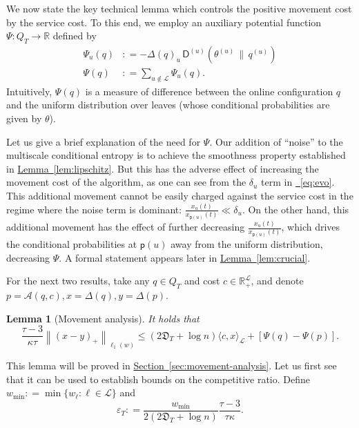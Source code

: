 \documentclass[11pt]{article}
\numberwithin{equation}{section}
\newtheorem{lemma}[theorem]{Lemma}
\theoremstyle{definition}
\theoremstyle{plain}
\newcommand{\R}{\mathbb R}
\newcommand{\expref}[2]{\hyperref[#2]{#1~\ref{#2}}}
\newcommand{\expeqref}[2]{\hyperref[#2]{#1~\eqref{#2}}}
\newcommand{\calA}{\mathcal A}
\newcommand{\calL}{\mathcal L}
\newcommand{\dmid}{\,\|\,}
\newcommand{\eps}{\varepsilon}
\newcommand{\depth}{\mathfrak{D}}
\newcommand{\seteq}{\mathrel{\mathop:}=}
\newcommand{\sfp}{\mathsf{p}}
\newcommand{\sfD}{\mathsf D}
\begin{document}
We now state the key technical lemma
which controls the positive movement cost by
the service cost.  To this end, we employ an auxiliary potential function $\Psi : Q_T \to \R$ defined by
\begin{align*}
\Psi_u(q) &\seteq - \Delta(q)_u\,\sfD^{(u)}\!\left(\theta^{(u)} \dmid q^{(u)}\right) \\
\Psi(q) &\seteq \sum_{u \notin \calL} \Psi_u(q).
\end{align*}
Intuitively, $\Psi(q)$ is a measure of difference between the online configuration $q$ and the uniform distribution over leaves (whose conditional probabilities are given by $\theta$).

Let us give a brief explanation of the need for $\Psi$.
Our addition of ``noise'' to the multiscale conditional entropy
is to achieve the smoothness property established in \expref{Lemma}{lem:lipschitz}.
But this has the adverse effect of increasing the movement cost
of the algorithm, as one can see from the $\delta_u$ term in \expeqref{\!}{eq:evo}.
This additional movement cannot be easily charged against the service cost in
the regime where the noise term is dominant:  $\frac{x_u(t)}{x_{\sfp(u)}(t)} \ll \delta_u$.
On the other hand, this additional movement has the effect of further decreasing $\frac{x_u(t)}{x_{\sfp(u)}(t)}$,
which drives the conditional probabilities at $\sfp(u)$ away from the uniform distribution,
decreasing $\Psi$.  A formal statement appears later in \expref{Lemma}{lem:crucial}.

For the next two results, take any $q \in Q_T$ and cost $c \in \R_+^{\calL}$, and denote $p=\calA(q,c), x =\Delta(q),y=\Delta(p)$.

\begin{lemma}[Movement analysis]
	\label{lem:movement}
   It holds that
	\[
	\frac{\tau-3}{\kappa \tau} \left\|\left(x-y\right)_+\right\|_{\ell_1(w)} \leq (2 \depth_T + \log n) \langle c, x\rangle_{\calL} +
	\left[\Psi(q)-\Psi(p)\right].
	\]
\end{lemma}

This lemma will be proved in \expref{Section}{sec:movement-analysis}.
Let us first see that it can be used to establish bounds on the competitive ratio.
Define $w_{\min} \seteq \min \{ w_{\ell} : \ell \in \calL \}$
and
\[
\eps_T \seteq \frac{w_{\min}}{2 (2\depth_T+\log n)} \frac{\tau-3}{\tau\kappa}.
\]
\end{document}
